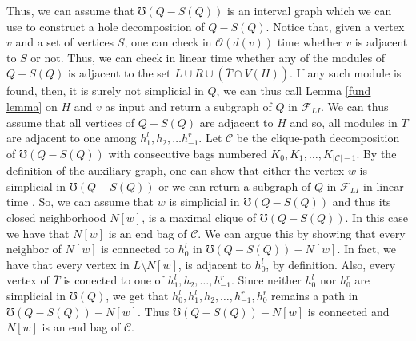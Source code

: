 \documentclass{article}
\theoremstyle{definition}
\begin{document}
    Thus, we can assume
    that $\mho\left(Q - S\left(Q\right)\right)$
    is an interval graph
    which we can use to
    construct a hole
    decomposition of $Q - S\left(Q\right)$.
    Notice that, given
    a vertex $v$ and
    a set of vertices
    $S$, one
    can check in
    $\mathcal{O}\left(d\left(v\right)\right)$
    time whether $v$ 
    is adjacent to $S$ 
    or not. Thus, we can
    check in linear time
    whether any of 
    the modules of $Q - S\left(Q\right)$ 
    is adjacent to the set
    $L \cup R \cup \left(\overline{T} \cap V\left(H\right)\right)$.
    If any such module is found,
    then, it is surely not
    simplicial in $Q$,
    we can thus call
    Lemma \ref{fund lemma}
    on $H$ and $v$ as input
    and return a subgraph
    of $Q$ in $\mathcal{F}_{LI}$.
    We can thus assume 
    that all vertices of
    $Q - S\left(Q\right)$ 
    are adjacent to $H$ 
    and so, all modules
    in $\overline{T}$
    are adjacent to
    one among $h_1^{l}, h_2, \ldots h_{-1}^{r}$.
    Let $\mathcal{C}$ be the
    clique-path decomposition
    of $\mho\left(Q - S\left(Q\right)\right)$
    with consecutive bags
    numbered $K_0, K_1, \ldots, K_{\left|\mathcal{C}\right| - 1}$.
    By the definition of
    the auxiliary graph, 
    one can
    show that either the vertex $w$ 
    is simplicial in $\mho\left(Q - S\left(Q\right)\right)$ or
    we can return a
    subgraph of $Q$ in
    $\mathcal{F}_{LI}$
    in linear time \cite{main}.
    So, we can assume
    that $w$ is simplicial
    in $\mho\left(Q - S\left(Q\right)\right)$
    and thus
    its closed neighborhood
    $N\left[w\right]$, is
    a maximal clique of
    $\mho\left(Q - S\left(Q\right)\right)$.
    In this case we have
    that $N\left[w\right]$ 
    is an end bag of
    $\mathcal{C}$.
    We can argue this
    by showing that
    every neighbor 
    of $N\left[w\right]$ 
    is connected to $h_0^{l}$ 
    in $\mho\left(Q - S\left(Q\right)\right) - N\left[w\right]$.
    In fact, we have that
    every vertex in
    $L \setminus N\left[w\right]$,
    is adjacent to $h_0^{l}$,
    by definition.
    Also, every vertex of 
    $\overline{T}$ is conected
    to one of $h_1^{l}, h_2, \ldots, h_{-1}^{r}$.
    Since neither $h_0^{l}$ nor $h_0^{r}$ 
    are simplicial in $\mho\left(Q\right)$,
    we get that $h_0^{l}, h_1^{l}, h_2, \ldots,
    h_{-1}^{r}, h_0^{r}$ remains a path
    in $\mho\left(Q - S\left(Q\right)\right) - N\left[w\right]$.
    Thus $\mho\left(Q - S\left(Q\right)\right) - N\left[w\right]$
    is connected and $N\left[w\right]$
    is an end bag of $\mathcal{C}$.
\end{document}
